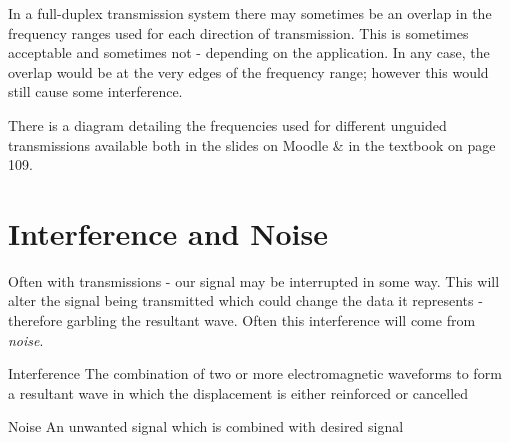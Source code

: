In a full-duplex transmission system there may sometimes be an overlap in the frequency ranges used for each direction of transmission. This is sometimes acceptable and sometimes not - depending on the application. In any case, the overlap would be at the very edges of the frequency range; however this would still cause some interference.

\begin{extlink}
There is a diagram detailing the frequencies used for different unguided transmissions available both in the slides on Moodle \& in the textbook on page 109.
\end{extlink}

\section{Interference and Noise}
Often with transmissions - our signal may be interrupted in some way. This will alter the signal being transmitted which could change the data it represents - therefore garbling the resultant wave. Often this interference will come from \textit{noise}. 

\begin{define}
\item[Interference] The combination of two or more electromagnetic waveforms to form a resultant wave in which the displacement is either reinforced or cancelled
\item[Noise] An unwanted signal which is combined with desired signal 
\end{define}

